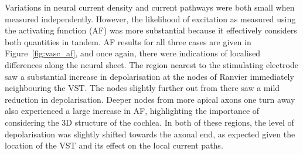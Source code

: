Variations in neural current density and current pathways were both small when
measured independently. However, the likelihood of excitation as measured using
the activating function (AF) was more substantial because it effectively
considers both quantities in tandem. AF results for all three cases are given in
Figure~\ref{fig:vasc_af}, and once again, there were indications of localised
differences along the neural sheet. The region nearest to the stimulating
electrode saw a substantial increase in depolarisation at the nodes of Ranvier
immediately neighbouring the VST. The nodes slightly further out from there saw
a mild reduction in depolarisation. Deeper nodes from more apical axons one turn
away also experienced a large increase in AF, highlighting the importance of
considering the 3D structure of the cochlea. In both of these regions, the level
of depolarisation was slightly shifted towards the axonal end, as expected given
the location of the VST and its effect on the local current paths.

